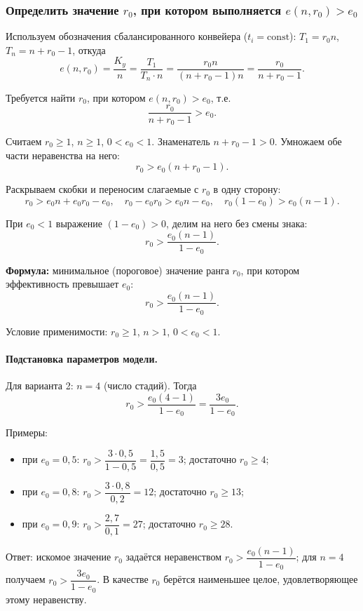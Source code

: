 \subsubsection*{Определить значение $r_0$, при котором выполняется $e(n, r_0) > e_0$}

Используем обозначения сбалансированного конвейера ($t_i = \mathrm{const}$): $T_1 = r_0 n$, $T_n = n + r_0 - 1$, откуда
\[
e(n, r_0) = \frac{K_y}{n} = \frac{T_1}{T_n \cdot n} = \frac{r_0 n}{(n + r_0 - 1) n} = \frac{r_0}{n + r_0 - 1}.
\]

Требуется найти $r_0$, при котором $e(n, r_0) > e_0$, т.е.
\[
\frac{r_0}{n + r_0 - 1} > e_0.
\]

Считаем $r_0 \geq 1$, $n \geq 1$, $0 < e_0 < 1$. Знаменатель $n + r_0 - 1 > 0$. Умножаем обе части неравенства на него:
\[
r_0 > e_0 (n + r_0 - 1).
\]

Раскрываем скобки и переносим слагаемые с $r_0$ в одну сторону:
\[
r_0 > e_0 n + e_0 r_0 - e_0, \quad r_0 - e_0 r_0 > e_0 n - e_0, \quad r_0(1 - e_0) > e_0(n - 1).
\]

При $e_0 < 1$ выражение $(1 - e_0) > 0$, делим на него без смены знака:
\[
r_0 > \frac{e_0 (n - 1)}{1 - e_0}.
\]

\textbf{Формула:} минимальное (пороговое) значение ранга $r_0$, при котором эффективность превышает $e_0$:
\[
\boxed{r_0 > \frac{e_0 (n - 1)}{1 - e_0}}.
\]

Условие применимости: $r_0 \geq 1$, $n > 1$, $0 < e_0 < 1$.

\paragraph{Подстановка параметров модели.}
Для варианта 2: $n = 4$ (число стадий). Тогда
\[
r_0 > \frac{e_0 (4 - 1)}{1 - e_0} = \frac{3 e_0}{1 - e_0}.
\]

Примеры:
\begin{itemize}
    \item при $e_0 = 0{,}5$: $r_0 > \dfrac{3 \cdot 0{,}5}{1 - 0{,}5} = \dfrac{1{,}5}{0{,}5} = 3$; достаточно $r_0 \geq 4$;
    \item при $e_0 = 0{,}8$: $r_0 > \dfrac{3 \cdot 0{,}8}{0{,}2} = 12$; достаточно $r_0 \geq 13$;
    \item при $e_0 = 0{,}9$: $r_0 > \dfrac{2{,}7}{0{,}1} = 27$; достаточно $r_0 \geq 28$.
\end{itemize}

Ответ: искомое значение $r_0$ задаётся неравенством $r_0 > \dfrac{e_0 (n - 1)}{1 - e_0}$; для $n = 4$ получаем $r_0 > \dfrac{3 e_0}{1 - e_0}$. В качестве $r_0$ берётся наименьшее целое, удовлетворяющее этому неравенству.
